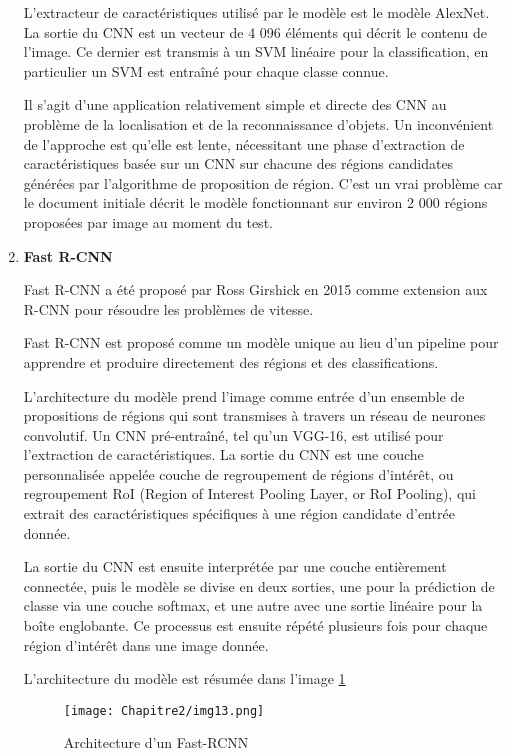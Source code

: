 \begin{enumerate}
L'extracteur de caractéristiques utilisé par le modèle est le modèle AlexNet. La sortie du CNN est un vecteur de 4 096 éléments qui décrit le contenu de l'image. Ce dernier est transmis à un SVM linéaire pour la classification, en particulier un SVM est entraîné pour chaque classe connue.

Il s'agit d'une application relativement simple et directe des CNN au problème de la localisation et de la reconnaissance d'objets. Un inconvénient de l'approche est qu'elle est lente, nécessitant une phase d'extraction de caractéristiques basée sur un CNN sur chacune des régions candidates générées par l'algorithme de proposition de région. C'est un vrai problème car le document initiale décrit le modèle fonctionnant sur environ 2 000 régions proposées par image au moment du test.
          
 \item  \textbf{Fast R-CNN}\cite{fast_rcnn_paper}
 
Fast R-CNN a été proposé par Ross Girshick en 2015 comme extension aux R-CNN  pour résoudre les problèmes de vitesse.

Fast R-CNN est proposé comme un modèle unique au lieu d'un pipeline pour apprendre et produire directement des régions et des classifications.

L'architecture du modèle prend l'image comme entrée d'un ensemble de propositions de régions qui sont transmises à travers un réseau de neurones convolutif. Un CNN pré-entraîné, tel qu'un VGG-16, est utilisé pour l'extraction de caractéristiques. La sortie du CNN est une couche personnalisée appelée couche de regroupement de régions d'intérêt, ou regroupement RoI (Region of Interest Pooling Layer, or RoI Pooling), qui extrait des caractéristiques spécifiques à une région candidate d'entrée donnée. 

La sortie du CNN est ensuite interprétée par une couche entièrement connectée, puis le modèle se divise en deux sorties, une pour la prédiction de classe via une couche softmax, et une autre avec une sortie linéaire pour la boîte englobante. Ce processus est ensuite répété plusieurs fois pour chaque région d'intérêt dans une image donnée.

L'architecture du modèle est résumée dans l'image \ref{img13}

\begin{figure}[H]
          \centering
          \texttt{[image: Chapitre2/img13.png]}
          \caption{Architecture d'un Fast-RCNN \cite{fast_rcnn_paper}}
          \label{img13}
          \end{figure}


\end{enumerate}
